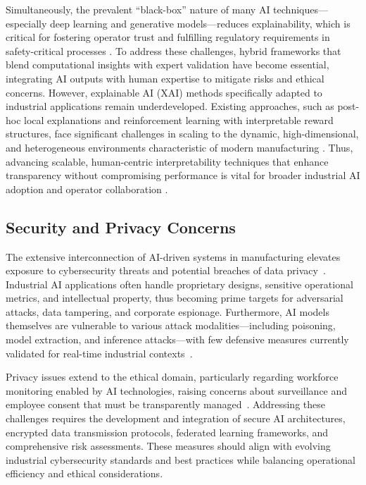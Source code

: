 \documentclass[sigconf]{acmart}
\begin{document}
Simultaneously, the prevalent ``black-box'' nature of many AI techniques—especially deep learning and generative models—reduces explainability, which is critical for fostering operator trust and fulfilling regulatory requirements in safety-critical processes \cite{ref2,ref34}. To address these challenges, hybrid frameworks that blend computational insights with expert validation have become essential, integrating AI outputs with human expertise to mitigate risks and ethical concerns. However, explainable AI (XAI) methods specifically adapted to industrial applications remain underdeveloped. Existing approaches, such as post-hoc local explanations and reinforcement learning with interpretable reward structures, face significant challenges in scaling to the dynamic, high-dimensional, and heterogeneous environments characteristic of modern manufacturing \cite{ref14,ref36}. Thus, advancing scalable, human-centric interpretability techniques that enhance transparency without compromising performance is vital for broader industrial AI adoption and operator collaboration \cite{ref14}.

\subsection{Security and Privacy Concerns}

The extensive interconnection of AI-driven systems in manufacturing elevates exposure to cybersecurity threats and potential breaches of data privacy~\cite{ref13,ref37}. Industrial AI applications often handle proprietary designs, sensitive operational metrics, and intellectual property, thus becoming prime targets for adversarial attacks, data tampering, and corporate espionage. Furthermore, AI models themselves are vulnerable to various attack modalities—including poisoning, model extraction, and inference attacks—with few defensive measures currently validated for real-time industrial contexts~\cite{ref37,ref41}.

Privacy issues extend to the ethical domain, particularly regarding workforce monitoring enabled by AI technologies, raising concerns about surveillance and employee consent that must be transparently managed~\cite{ref2}. Addressing these challenges requires the development and integration of secure AI architectures, encrypted data transmission protocols, federated learning frameworks, and comprehensive risk assessments. These measures should align with evolving industrial cybersecurity standards and best practices while balancing operational efficiency and ethical considerations.
\end{document}
